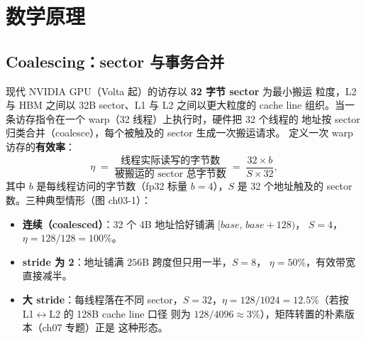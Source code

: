 \section{数学原理}\label{sec:ch03-math}

\subsection{Coalescing：sector 与事务合并}

现代 NVIDIA GPU（Volta 起）的访存以 \textbf{32 字节 sector} 为最小搬运
粒度，L2 与 HBM 之间以 32B sector、L1 与 L2 之间以更大粒度的 cache line
组织。当一条访存指令在一个 warp（32 线程）上执行时，硬件把 32 个线程的
地址按 sector 归类合并（coalesce），每个被触及的 sector 生成一次搬运请求。
定义一次 warp 访存的\textbf{有效率}：
\begin{equation}
  \eta \;=\; \frac{\text{线程实际读写的字节数}}
                  {\text{被搬运的 sector 总字节数}}
  \;=\; \frac{32 \times b}{S \times 32},
  \label{eq:ch03-eta}
\end{equation}
其中 $b$ 是每线程访问的字节数（fp32 标量 $b = 4$），$S$ 是 32 个地址触及的
sector 数。三种典型情形（图 ch03-1）：

\begin{itemize}
\item \textbf{连续（coalesced）}：32 个 4B 地址恰好铺满 $[base,\, base+128)$，
  $S = 4$，$\eta = 128/128 = 100\%$。
\item \textbf{stride 为 2}：地址铺满 $256$B 跨度但只用一半，$S = 8$，
  $\eta = 50\%$，有效带宽直接减半。
\item \textbf{大 stride}：每线程落在不同 sector，$S = 32$，$\eta =
  128/1024 = 12.5\%$（若按 L1$\leftrightarrow$L2 的 128B cache line 口径
  则为 $128/4096 \approx 3\%$），矩阵转置的朴素版本（ch07 专题）正是
  这种形态。
\end{itemize}


